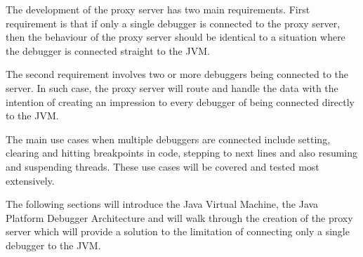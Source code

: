 \documentclass[..thesis.tex]{subfiles}
\begin{document}
The development of the proxy server has two main requirements. 
First requirement is that if only a single debugger is connected to the proxy server, then the behaviour of the proxy server should be identical to a situation where the debugger is connected straight to the JVM.

The second requirement involves two or more debuggers being connected to the server. 
In such case, the proxy server will route and handle the data with the intention of creating an impression to every debugger of being connected directly to the JVM.

The main use cases when multiple debuggers are connected include setting, clearing and hitting breakpoints in code, stepping to next lines and also resuming and suspending threads.
These use cases will be covered and tested most extensively.

The following sections will introduce the Java Virtual Machine, the Java Platform Debugger Architecture and will walk through the creation of the proxy server which will provide a solution to the limitation of connecting only a single debugger to the JVM.
\end{document}
